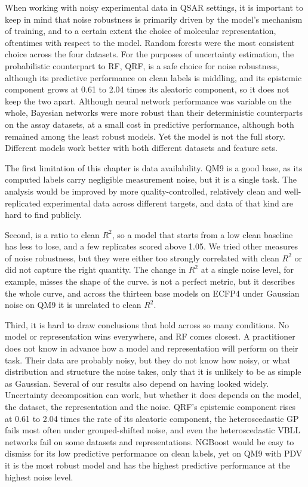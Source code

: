 When working with noisy experimental data in QSAR settings, it is important to keep in mind that noise robustness is primarily driven by the model's mechanism of training, and to a certain extent the choice of molecular representation, oftentimes with respect to the model. Random forests were the most consistent choice across the four datasets. For the purposes of uncertainty estimation, the probabilistic counterpart to RF, QRF, is a safe choice for noise robustness, although its predictive performance on clean labels is middling, and its epistemic component grows at 0.61 to 2.04 times its aleatoric component, so it does not keep the two apart. Although neural network performance was variable on the whole, Bayesian networks were more robust than their deterministic counterparts on the assay datasets, at a small cost in predictive performance, although both remained among the least robust models. Yet the model is not the full story. Different models work better with both different datasets and feature sets.

The first limitation of this chapter is data availability. QM9 is a good base, as its computed labels carry negligible measurement noise, but it is a single task. The analysis would be improved by more quality-controlled, relatively clean and well-replicated experimental data across different targets, and data of that kind are hard to find publicly.

Second, \aucnorm{} is a ratio to clean $R^2$, so a model that starts from a low clean baseline has less to lose, and a few replicates scored above 1.05. We tried other measures of noise robustness, but they were either too strongly correlated with clean $R^2$ or did not capture the right quantity. The change in $R^2$ at a single noise level, for example, misses the shape of the curve. \aucnorm{} is not a perfect metric, but it describes the whole curve, and across the thirteen base models on ECFP4 under Gaussian noise on QM9 it is unrelated to clean $R^2$.

Third, it is hard to draw conclusions that hold across so many conditions. No model or representation wins everywhere, and RF comes closest. A practitioner does not know in advance how a model and representation will perform on their task. Their data are probably noisy, but they do not know how noisy, or what distribution and structure the noise takes, only that it is unlikely to be as simple as Gaussian. Several of our results also depend on having looked widely. Uncertainty decomposition can work, but whether it does depends on the model, the dataset, the representation and the noise. QRF's epistemic component rises at 0.61 to 2.04 times the rate of its aleatoric component, the heteroscedastic GP fails most often under grouped-shifted noise, and even the heteroscedastic VBLL networks fail on some datasets and representations. NGBoost would be easy to dismiss for its low predictive performance on clean labels, yet on QM9 with PDV it is the most robust model and has the highest predictive performance at the highest noise level.

